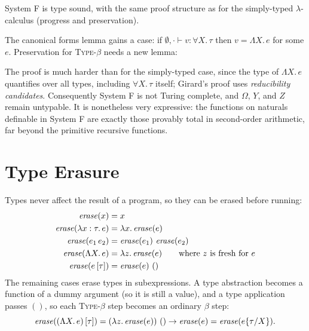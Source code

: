 System F is type sound, with the same proof structure as for the simply-typed
$\lambda$-calculus (progress and preservation).


The canonical forms lemma gains a case: if $\emptyset, \cdot \vdash v : \forall X.\,
\tau$ then $v = \Lambda X.\, e$ for some $e$. Preservation for \textsc{Type-$\beta$}
needs a new lemma:



The proof is much harder than for the simply-typed case, since the type of
$\Lambda X.\, e$ quantifies over all types, including $\forall X.\, \tau$ itself;
Girard's proof uses \emph{reducibility candidates}. Consequently System F is not
Turing complete, and $\Omega$, $Y$, and $Z$ remain untypable. It is nonetheless very
expressive: the functions on naturals definable in System F are exactly those
provably total in second-order arithmetic, far beyond the primitive recursive
functions.

\section{Type Erasure}

Types never affect the result of a program, so they can be erased before running:
\begin{align*}
\mathit{erase}(x) &= x \\
\mathit{erase}(\lambda x : \tau.\, e) &= \lambda x.\, \mathit{erase}(e) \\
\mathit{erase}(e_1\, e_2) &= \mathit{erase}(e_1)\ \mathit{erase}(e_2) \\
\mathit{erase}(\Lambda X.\, e) &= \lambda z.\, \mathit{erase}(e) \qquad \text{where } z \text{ is fresh for } e \\
\mathit{erase}(e\,[\tau]) &= \mathit{erase}(e)\ ()
\end{align*}
The remaining cases erase types in subexpressions. A type abstraction becomes a
function of a dummy argument (so it is still a value), and a type application passes
$()$, so each \textsc{Type-$\beta$} step becomes an ordinary $\beta$ step:
\[
\mathit{erase}((\Lambda X.\, e)\,[\tau]) = (\lambda z.\, \mathit{erase}(e))\ () \to \mathit{erase}(e) = \mathit{erase}(e\{\tau/X\}).
\]

